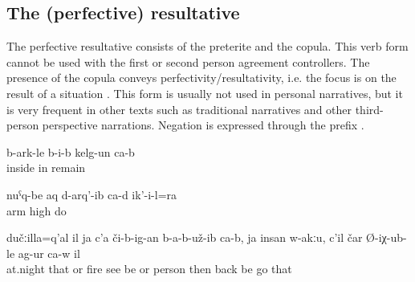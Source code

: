 
\subsection{The (perfective) resultative}
\label{ssec:The (perfective) resultative}

The perfective resultative consists of the preterite and the copula. This verb form cannot be used with the first or second person agreement controllers. The presence of the copula conveys perfectivity/resultativity, i.e. the focus is on the result of a situation . This form is usually not used in personal narratives, but it is very frequent in other texts such as traditional narratives and other third-person perspective narrations. Negation is expressed through the prefix  .
%
\begin{exe}
	\ex	\label{ex:(The color) has remained inside}
	\gll	b-ark-le	b-i-b	kelg-un	ca-b\\
		inside	in	remain	\\
	\glt	{}

	\ex	\label{ex:He has also taken up his hands}
	\gll	nuˁq-be	aq	d-arq'-ib	ca-d	ik'-i-l=ra\\
		arm	high	do		\\
	\glt	{}
	
	\ex	\label{ex:‎‎‎It was at night, there was no fire visible, nobody is there, then he turned and came back}
	\gll	dučːilla=q'al	il	ja	c'a	či-b-ig-an	b-a-b-už-ib	ca-b,		ja	insan	w-akːu,		c'il	čar	Ø-iχ-ub-le	ag-ur	ca-w	il\\
		at.night	that	or	fire	see	be			or	person	\tsc{m-}	then	back	be	go		that\\
	\glt	{}
\end{exe}

